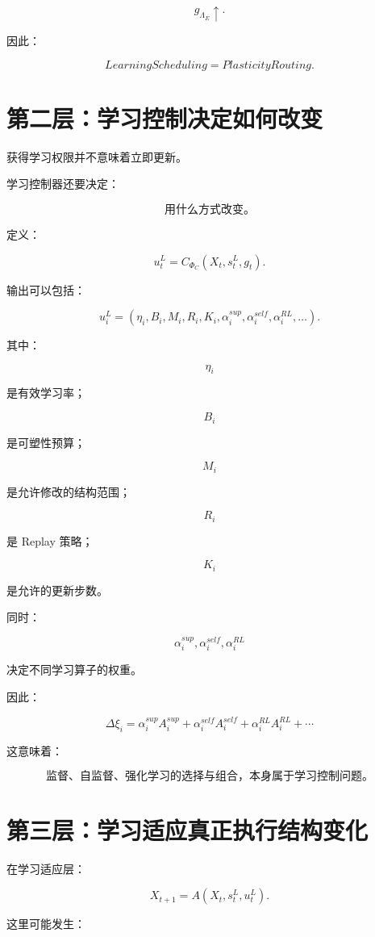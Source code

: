 \[
g_{\Lambda_E}\uparrow.
\]

因此：

\[
\boxed{
LearningScheduling
=
PlasticityRouting.
}
\]


\section{第二层：学习控制决定如何改变}

获得学习权限并不意味着立即更新。

学习控制器还要决定：

\[
\boxed{
\text{用什么方式改变。}
}
\]

定义：

\[
\boxed{
u_t^L
=
C_{\Phi_C}
(
X_t,
s_t^L,
g_t
).
}
\]

输出可以包括：

\[
u_i^L
=
(
\eta_i,
B_i,
M_i,
R_i,
K_i,
\alpha_i^{sup},
\alpha_i^{self},
\alpha_i^{RL},
\ldots
).
\]

其中：

\[
\eta_i
\]

是有效学习率；

\[
B_i
\]

是可塑性预算；

\[
M_i
\]

是允许修改的结构范围；

\[
R_i
\]

是 Replay 策略；

\[
K_i
\]

是允许的更新步数。

同时：

\[
\alpha_i^{sup},
\alpha_i^{self},
\alpha_i^{RL}
\]

决定不同学习算子的权重。

因此：

\[
\boxed{
\Delta\xi_i
=
\alpha_i^{sup}
A_i^{sup}
+
\alpha_i^{self}
A_i^{self}
+
\alpha_i^{RL}
A_i^{RL}
+\cdots
}
\]

这意味着：

\[
\boxed{
\text{监督、自监督、强化学习的选择与组合，本身属于学习控制问题。}
}
\]


\section{第三层：学习适应真正执行结构变化}

在学习适应层：

\[
\boxed{
X_{t+1}
=
A
(
X_t,
s_t^L,
u_t^L
).
}
\]

这里可能发生：

